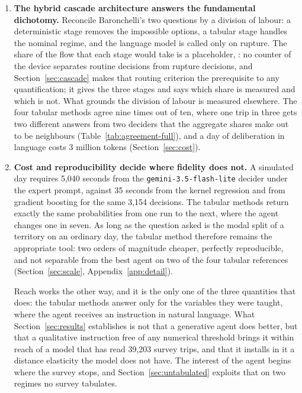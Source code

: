 \begin{enumerate}
\item \textbf{The hybrid cascade architecture answers the fundamental dichotomy.} Reconcile Baronchelli's two questions by a division of labour: a deterministic stage removes the impossible options, a tabular stage handles the nominal regime, and the language model is called only on rupture. The share of the flow that each stage would take is a placeholder, : no counter of the device separates routine decisions from rupture decisions, and Section~\ref{sec:cascade} makes that routing criterion the prerequisite to any quantification; it gives the three stages and says which share is measured and which is not. What grounds the division of labour is measured elsewhere. The four tabular methods agree nine times out of ten, where one trip in three gets two different answers from two deciders that the aggregate shares make out to be neighbours (Table~\ref{tab:agreement-full}), and a day of deliberation in language costs 3 million tokens (Section~\ref{sec:cost}).

\item \textbf{Cost and reproducibility decide where fidelity does not.} A simulated day requires 5{,}040 seconds from the \texttt{gemini-3.5-flash-lite} decider under the expert prompt, against 35 seconds from the kernel regression and from gradient boosting for the same 3{,}154 decisions. The tabular methods return exactly the same probabilities from one run to the next, where the agent changes one in seven. As long as the question asked is the modal split of a territory on an ordinary day, the tabular method therefore remains the appropriate tool: two orders of magnitude cheaper, perfectly reproducible, and not separable from the best agent on two of the four tabular references (Section~\ref{sec:scale}, Appendix~\ref{app:detail}).

Reach works the other way, and it is the only one of the three quantities that does: the tabular methods answer only for the variables they were taught, where the agent receives an instruction in natural language. What Section~\ref{sec:results} establishes is not that a generative agent does better, but that a qualitative instruction free of any numerical threshold brings it within reach of a model that has read 39{,}203 survey trips, and that it installs in it a distance elasticity the model does not have. The interest of the agent begins where the survey stops, and Section~\ref{sec:untabulated} exploits that on two regimes no survey tabulates.

\end{enumerate}

